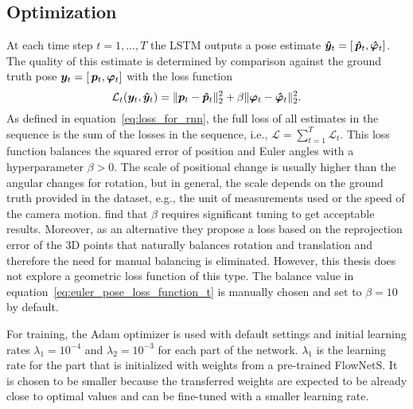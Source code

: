 		\subsection{Optimization}
			At each time step $t = 1, \dots, T$ the LSTM outputs a pose estimate 
			$\bm{\hat{y}}_t = \left[ \, \bm{\hat{p}}_t,  \bm{\hat{\varphi}}_t \right]$.
			The quality of this estimate is determined by comparison against the ground truth pose 
			$\bm{y}_t = \left[ \, \bm{p}_t,  \bm{\varphi}_t \right]$
			with the loss function
			\begin{equation}\label{eq:euler_pose_loss_function_t}
				\mathcal{L}_t(\bm{y}_t, \bm{\hat{y}}_t) = 
					\lVert \bm{p}_t - \bm{\hat{p}}_t \rVert_2^2 + 
					\beta \lVert \bm{\varphi}_t - \bm{\hat{\varphi}}_t \rVert_2^2.
			\end{equation}
			As defined in equation~\ref{eq:loss_for_rnn}, the full loss of all estimates in the sequence is the sum of the losses in the sequence, i.e., 
			$\mathcal{L} = \sum_{t = 1}^{T} \mathcal{L}_t$.
			This loss function balances the squared error of position and Euler angles with a hyperparameter $\beta > 0$.
			The scale of positional change is usually higher than the angular changes for rotation, but in general, the scale depends on the ground truth provided in the dataset, e.g., the unit of measurements used or the speed of the camera motion.
			\cite{kendall2017geometric} find that $\beta$ requires significant tuning to get acceptable results.
			Moreover, as an alternative they propose a loss based on the reprojection error of the 3D points that naturally balances rotation and translation and therefore the need for manual balancing is eliminated.
			However, this thesis does not explore a geometric loss function of this type.
			The balance value in equation~\ref{eq:euler_pose_loss_function_t} is manually chosen and set to $\beta = 10$ by default.
			
			
			For training, the Adam optimizer is used with default settings and initial learning rates $\lambda_1 = 10^{-4}$ and $\lambda_2 = 10^{-3}$ for each part of the network.
			$\lambda_1$ is the learning rate for the part that is initialized with weights from a pre-trained FlowNetS.
			It is chosen to be smaller because the transferred weights are expected to be already close to optimal values and can be fine-tuned with a smaller learning rate.
			
			
